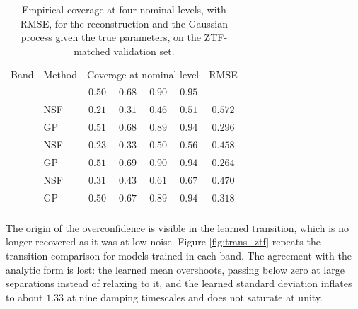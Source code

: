 \begin{table}[H]
\centering
\caption[Coverage at multiple levels on ZTF-matched data]{\label{tab:multilevel} Empirical coverage at four nominal levels, with RMSE, for the reconstruction and the Gaussian process given the true parameters, on the ZTF-matched validation set.}
\begin{tabular}{llccccc}
\hline
\noalign{\smallskip}
Band & Method & \multicolumn{4}{c}{Coverage at nominal level} & RMSE \\
\noalign{\smallskip}
& & $0.50$ & $0.68$ & $0.90$ & $0.95$ & \\
\noalign{\smallskip}
\hline
\noalign{\smallskip}
\multirow{2}{*}{$g$} & NSF & $0.21$ & $0.31$ & $0.46$ & $0.51$ & $0.572$ \\
                     & GP  & $0.51$ & $0.68$ & $0.89$ & $0.94$ & $0.296$ \\
\noalign{\smallskip}
\multirow{2}{*}{$r$} & NSF & $0.23$ & $0.33$ & $0.50$ & $0.56$ & $0.458$ \\
                     & GP  & $0.51$ & $0.69$ & $0.90$ & $0.94$ & $0.264$ \\
\noalign{\smallskip}
\multirow{2}{*}{$i$} & NSF & $0.31$ & $0.43$ & $0.61$ & $0.67$ & $0.470$ \\
                     & GP  & $0.50$ & $0.67$ & $0.89$ & $0.94$ & $0.318$ \\
\noalign{\smallskip}
\hline
\end{tabular}
\end{table}

The origin of the overconfidence is visible in the learned transition, which is no longer recovered as it was at low noise. Figure \ref{fig:trans_ztf} repeats the transition comparison for models trained in each band. The agreement with the analytic form is lost: the learned mean overshoots, passing below zero at large separations instead of relaxing to it, and the learned standard deviation inflates to about $1.33$ at nine damping timescales and does not saturate at unity. 

